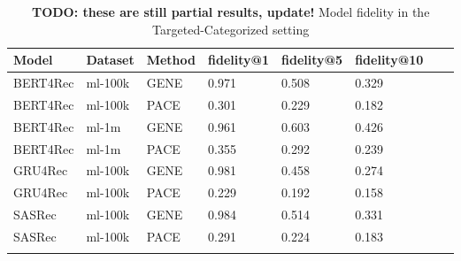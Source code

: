 \begingroup
    \setlength{\tabcolsep}{6pt} %
    \renewcommand{\arraystretch}{1.2} %
    \small %
    \begin{longtable}{|l|l|l|l|l|l|l|l|}
    \hline
\textbf{Model} & \textbf{Dataset} & \textbf{Method} & \textbf{fidelity@1} & \textbf{fidelity@5} & \textbf{fidelity@10} \\ \hline
\endhead
BERT4Rec & ml-100k & GENE & 0.971 & 0.508 & 0.329 \\
BERT4Rec & ml-100k & PACE & 0.301 & 0.229 & 0.182 \\\hline
BERT4Rec & ml-1m & GENE & 0.961 & 0.603 & 0.426 \\
BERT4Rec & ml-1m & PACE & 0.355 & 0.292 & 0.239 \\\hline
GRU4Rec & ml-100k & GENE & 0.981 & 0.458 & 0.274 \\
GRU4Rec & ml-100k & PACE & 0.229 & 0.192 & 0.158 \\\hline
SASRec & ml-100k & GENE & 0.984 & 0.514 & 0.331 \\
SASRec & ml-100k & PACE & 0.291 & 0.224 & 0.183 \\\hline
\caption{\textbf{TODO: these are still partial results, update!} Model fidelity in the Targeted-Categorized setting}
    \label{tab:eval_targ_cat}
    \end{longtable}
    \endgroup